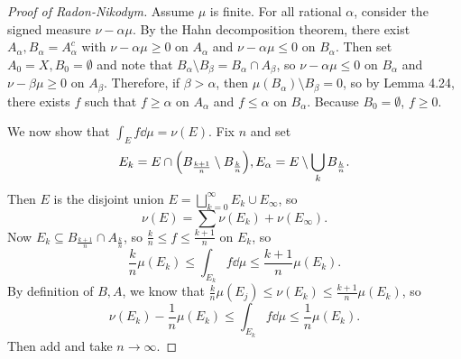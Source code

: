 \documentclass[leqno, openany]{memoir}
\theoremstyle{definition}
\theoremstyle{remark}
\theoremstyle{plain}
\theoremstyle{definition}
\theoremstyle{remark}
\begin{document}
\begin{proof}[Proof of Radon-Nikodym] Assume $\mu$ is finite. For all rational
    $\alpha$, consider the signed measure $\nu - \alpha \mu$. By the Hahn
    decomposition theorem, there exist $A_{\alpha}, B_{\alpha} = A_{\alpha}^c$
    with $\nu - \alpha \mu \geq 0$ on $A_{\alpha}$ and $\nu - \alpha \mu \leq
    0$ on $B_{\alpha}$. Then set $A_0 = X, B_0 = \emptyset$ and note that
    $B_{\alpha} \setminus B_{\beta} = B_{\alpha} \cap A_{\beta}$, so $\nu -
    \alpha \mu \leq 0$ on $B_{\alpha}$ and $\nu - \beta \mu \geq 0$ on
    $A_{\beta}$. Therefore, if $\beta > \alpha$, then $\mu(B_{\alpha})
    \setminus B_{\beta} = 0$, so by Lemma 4.24, there exists $f$ such that $f
    \geq \alpha$ on $A_{\alpha}$ and $f \leq \alpha$ on $B_{\alpha}$. Because
    $B_0 = \emptyset$, $f \geq 0$.

    We now show that $\int_E f \dd{\mu} = \nu(E)$. Fix $n$ and set \[ E_k = E
    \cap \qty( B_{\frac{k+1}{n}} \setminus B_{\frac{k}{n}} ), E_{\alpha} = E
\setminus \bigcup_k B_{\frac{k}{n}}. \] Then $E$ is the disjoint union $E =
\bigsqcup_{k=0}^{\infty} E_k \cup E_{\infty}$, so \[ \nu(E) = \sum \nu(E_k) +
    \nu(E_{\infty}). \] Now $E_k \subseteq B_{\frac{k+1}{n}} \cap
    A_{\frac{k}{n}}$, so $\frac{k}{n} \leq f \leq \frac{k+1}{n}$ on $E_k$, so
    \[ \frac{k}{n} \mu(E_k) \leq \int_{E_k} f \dd{\mu} \leq \frac{k+1}{n}
    \mu(E_k). \] By definition of $B, A$, we know that $\frac{k}{n} \mu(E_j)
    \leq \nu(E_k) \leq \frac{k+1}{n} \mu(E_k)$, so \[ \nu(E_k) - \frac{1}{n}
    \mu(E_k) \leq \int_{E_k} f \dd{\mu} \leq \frac{1}{n} \mu(E_k). \] Then add
    and take $n \to \infty$.  \end{proof}
\end{document}
